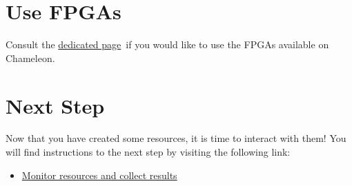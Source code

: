 \section{Use FPGAs}\label{use-fpgas}

Consult the
\href{https://www.chameleoncloud.org/docs/bare-metal-user-guide/fpga/}{dedicated
page}~if you would like to use the FPGAs available on Chameleon.

\section{Next Step}\label{next-step}

Now that you have created some resources, it is time to interact with
them! You will find instructions to the next step by visiting the
following link:

\begin{itemize}
\tightlist
\item
  \href{https://www.chameleoncloud.org/monitor-and-collect/}{Monitor
  resources and collect results}
\end{itemize}

